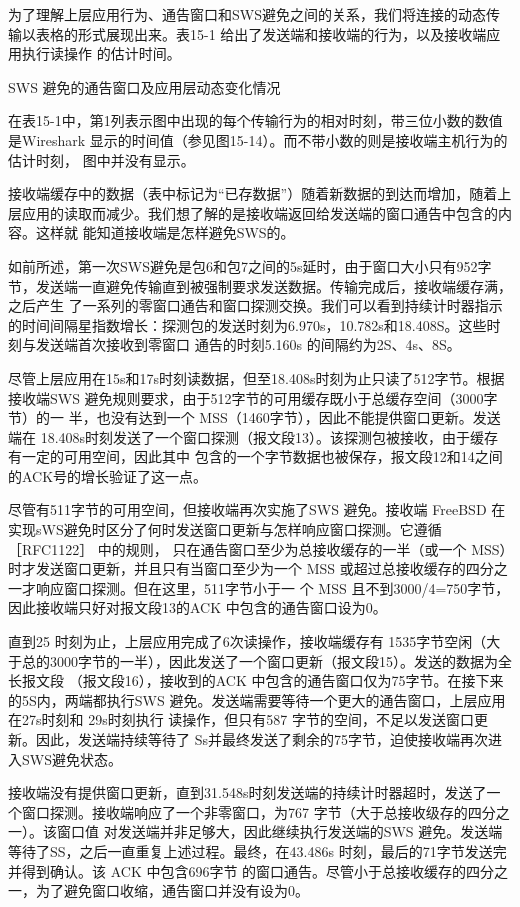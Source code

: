 为了理解上层应用行为、通告窗口和SWS避免之间的关系，我们将连接的动态传输以表格的形式展现出来。表15-1 给出了发送端和接收端的行为，以及接收端应用执行读操作
的估计时间。

SWS 避免的通告窗口及应用层动态变化情况


在表15-1中，第1列表示图中出现的每个传输行为的相对时刻，带三位小数的数值是Wireshark 显示的时间值（参见图15-14）。而不带小数的则是接收端主机行为的估计时刻，
图中并没有显示。

接收端缓存中的数据（表中标记为“已存数据”）随着新数据的到达而增加，随着上层应用的读取而减少。我们想了解的是接收端返回给发送端的窗口通告中包含的内容。这样就
能知道接收端是怎样避免SWS的。

如前所述，第一次SWS避免是包6和包7之间的5s延时，由于窗口大小只有952字节，发送端一直避免传输直到被强制要求发送数据。传输完成后，接收端缓存满，之后产生
了一系列的零窗口通告和窗口探测交换。我们可以看到持续计时器指示的时间间隔星指数增长：探测包的发送时刻为6.970s，10.782s和18.408S。这些时刻与发送端首次接收到零窗口
通告的时刻5.160s 的间隔约为2S、4s、8S。

尽管上层应用在15s和17s时刻读数据，但至18.408s时刻为止只读了512字节。根据接收端SWS 避免规则要求，由于512字节的可用缓存既小于总缓存空间（3000字节）的一
半，也没有达到一个 MSS（1460字节），因此不能提供窗口更新。发送端在 18.408s时刻发送了一个窗口探测（报文段13）。该探测包被接收，由于缓存有一定的可用空间，因此其中
包含的一个字节数据也被保存，报文段12和14之间的ACK号的增长验证了这一点。

尽管有511字节的可用空间，但接收端再次实施了SWS 避免。接收端 FreeBSD 在实现sWS避免时区分了何时发送窗口更新与怎样响应窗口探测。它遵循［RFC1122］ 中的规则，
只在通告窗口至少为总接收缓存的一半（或一个 MSS）时才发送窗口更新，并且只有当窗口至少为一个 MSS 或超过总接收缓存的四分之一才响应窗口探测。但在这里，511字节小于一
个 MSS 且不到3000/4=750字节，因此接收端只好对报文段13的ACK 中包含的通告窗口设为0。

直到25 时刻为止，上层应用完成了6次读操作，接收端缓存有 1535字节空闲（大于总的3000字节的一半），因此发送了一个窗口更新（报文段15）。发送的数据为全长报文段
（报文段16），接收到的ACK 中包含的通告窗口仅为75字节。在接下来的5S内，两端都执行SWS 避免。发送端需要等待一个更大的通告窗口，上层应用在27s时刻和 29s时刻执行
读操作，但只有587 字节的空间，不足以发送窗口更新。因此，发送端持续等待了 Ss并最终发送了剩余的75字节，迫使接收端再次进入SWS避免状态。

接收端没有提供窗口更新，直到31.548s时刻发送端的持续计时器超时，发送了一个窗口探测。接收端响应了一个非零窗口，为767 字节（大于总接收级存的四分之一）。该窗口值
对发送端并非足够大，因此继续执行发送端的SWS 避免。发送端等待了SS，之后一直重复上述过程。最终，在43.486s 时刻，最后的71字节发送完并得到确认。该 ACK 中包含696字节
的窗口通告。尽管小于总接收缓存的四分之一，为了避免窗口收缩，通告窗口并没有设为0。

